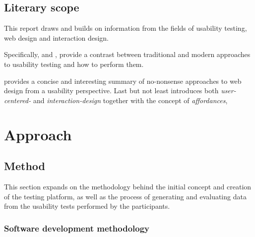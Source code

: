 \documentclass[nofilelist,dvipsnames]{cslthse-msc}
\begin{document}
	\section{Literary scope}

		This report draws and builds on information from the fields of usability
		testing, web design and interaction design.

		Specifically,  and
		, provide a contrast between
		traditional and modern approaches to usability testing and how to perform
		them.

		 provides a concise and interesting
		summary of no-nonsense approaches to web design from a usability perspective.
		Last but not least  introduces
		both \textit{user-centered-} and \textit{interaction-design} together
		with the concept of \textit{affordances},



	\chapter{Approach}

		\section{Method}

      This section expands on the methodology behind the initial concept and
      creation of the testing platform, as well as the process of generating
      and evaluating data from the usability tests performed by the participants.

      \subsection{Software development methodology}
\end{document}
